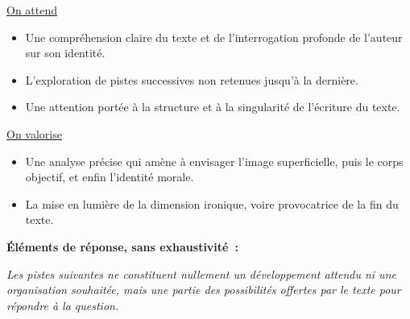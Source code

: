 {\underline{On attend}
\begin{itemize}
\item Une compréhension claire du texte et de l'interrogation profonde de l'auteur sur son
identité.
\item L'exploration de pistes successives non retenues jusqu'à la dernière.
\item Une attention portée à la structure et à la singularité de l'écriture du texte.
\end{itemize}

\underline{On valorise}
\begin{itemize}
\item Une analyse précise qui amène à envisager l'image superficielle, puis le corps objectif,
et enfin l'identité morale.
\item La mise en lumière de la dimension ironique, voire provocatrice de la fin du texte.
\end{itemize}

\textbf{Éléments de réponse, sans exhaustivité~:}

\textit{Les pistes suivantes ne constituent nullement un développement attendu ni une organisation
souhaitée, mais une partie des possibilités offertes par le texte pour répondre à la question.}

}
